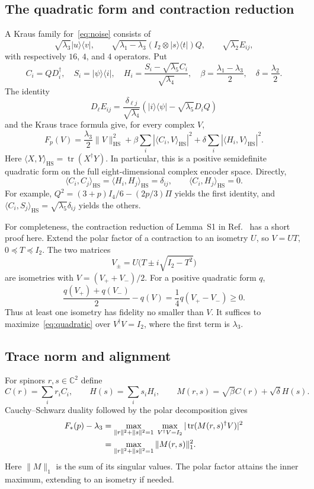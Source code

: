 \documentclass[11pt]{article}
\newcommand{\ket}[1]{\lvert #1\rangle}
\newcommand{\bra}[1]{\langle #1\rvert}
\newcommand{\tr}{\operatorname{tr}}
\newcommand{\HS}{\mathrm{HS}}
\begin{document}
\subsection{The quadratic form and contraction reduction}
A Kraus family for~\eqref{eq:noise} consists of
\[
 \sqrt{\lambda_3}\ket u\bra v,\qquad
 \sqrt{\lambda_1-\lambda_3}(I_2\otimes\ket s\bra t)Q,
 \qquad \sqrt{\lambda_2}E_{ij},
\]
with respectively $16$, $4$, and $4$ operators. Put
\[
 C_i=QD_i^\dagger,\quad S_i=\ket\psi\bra i,\quad
 H_i=\frac{S_i-\sqrt{\lambda_5}C_i}{\sqrt{\lambda_4}},\quad
 \beta=\frac{\lambda_1-\lambda_3}{2},\quad
 \delta=\frac{\lambda_2}{2}.
\]
The identity
\[
 D_\ell E_{ij}=\frac{\delta_{\ell j}}{\sqrt{\lambda_4}}
 \left(\ket i\bra\psi-\sqrt{\lambda_5}D_iQ\right)
\]
and the Kraus trace formula give, for every complex $V$,
\begin{equation}\label{eq:quadratic}
 F_p(V)=\frac{\lambda_3}{2}\|V\|_{\HS}^2+
 \beta\sum_i|\langle C_i,V\rangle_{\HS}|^2+
 \delta\sum_i|\langle H_i,V\rangle_{\HS}|^2.
\end{equation}
Here $\langle X,Y\rangle_{\HS}=\tr(X^\dagger Y)$.
In particular, this is a positive semidefinite quadratic form on the full
eight-dimensional complex encoder space. Directly,
\begin{equation}\label{eq:orthogonal}
 \langle C_i,C_j\rangle_{\HS}=\langle H_i,H_j\rangle_{\HS}=\delta_{ij},
 \qquad \langle C_i,H_j\rangle_{\HS}=0.
\end{equation}
For example, $Q^2=(3+p)I_4/6-(2p/3)\Pi$ yields the first identity,
and $\langle C_i,S_j\rangle_{\HS}=\sqrt{\lambda_5}\delta_{ij}$ yields the others.

For completeness, the contraction reduction of Lemma~S1 in Ref.~\cite{LiJiang}
has a short proof here. Extend the polar factor of a contraction to an
isometry $U$, so $V=UT$, $0\preceq T\preceq I_2$. The two matrices
\[
 V_\pm=U\bigl(T\pm i\sqrt{I_2-T^2}\bigr)
\]
are isometries with $V=(V_++V_-)/2$. For a positive quadratic form $q$,
\[
 \frac{q(V_+)+q(V_-)}2-q(V)=\frac14q(V_+-V_-)\geq0.
\]
Thus at least one isometry has fidelity no smaller than $V$.
It suffices to maximize~\eqref{eq:quadratic} over $V^\dagger V=I_2$,
where the first term is $\lambda_3$.

\subsection{Trace norm and alignment}
For spinors $r,s\in\mathbb C^2$ define
\[
 C(r)=\sum_i r_iC_i,\qquad H(s)=\sum_i s_iH_i,\qquad
 M(r,s)=\sqrt\beta C(r)+\sqrt\delta H(s).
\]
Cauchy--Schwarz duality followed by the polar decomposition gives
\begin{align}
 F_*(p)-\lambda_3
 &=\max_{\|r\|^2+\|s\|^2=1}\;
 \max_{V^\dagger V=I_2}|\tr(M(r,s)^\dagger V)|^2\notag\\
 &=\max_{\|r\|^2+\|s\|^2=1}\|M(r,s)\|_1^2.\label{eq:tracenorm}
\end{align}
Here $\|M\|_1$ is the sum of its singular values. The polar factor attains
the inner maximum, extending to an isometry if needed.
\end{document}
